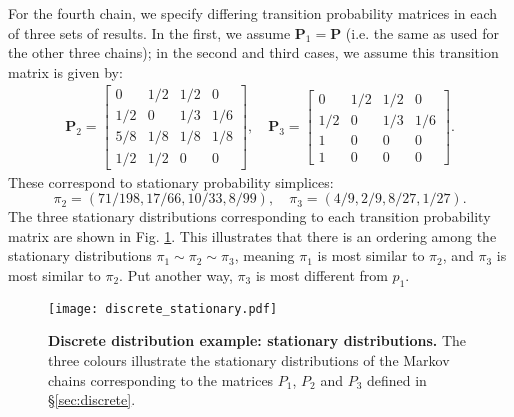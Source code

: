 \documentclass{article}
\begin{document}
For the fourth chain, we specify differing transition probability matrices in each of three sets of results. In the first, we assume $\boldsymbol{P}_1=\boldsymbol{P}$ (i.e. the same as used for the other three chains); in the second and third cases, we assume this transition matrix is given by:
%
\begin{gather}
\boldsymbol{P}_2
=
\begin{bmatrix}
0 & 1/2 & 1/2 & 0\\
1/2 & 0 & 1/3 & 1/6\\
5/8 & 1/8 & 1/8 & 1/8\\
1/2 & 1/2 & 0 & 0
\end{bmatrix},\quad
\boldsymbol{P}_3
=
\begin{bmatrix}
0 & 1/2 & 1/2 & 0\\
1/2 & 0 & 1/3 & 1/6\\
1 & 0 & 0 & 0\\
1 & 0 & 0 & 0
\end{bmatrix}.
\end{gather}
%
These correspond to stationary probability simplices:
%
\begin{equation}
\pi_2 = (71/198, 17/66, 10/33, 8/99), \quad \pi_3 = (4/9, 2/9, 8/27, 1/27).
\end{equation}
%
The three stationary distributions corresponding to each transition probability matrix are shown in Fig. \ref{fig:discrete_stationary}. This illustrates that there is an ordering among the stationary distributions $\pi_1\sim\pi_2\sim\pi_3$, meaning $\pi_1$ is most similar to $\pi_2$, and $\pi_3$ is most similar to $\pi_2$. Put another way, $\pi_3$ is most different from $p_1$.

\begin{figure}[!htb]
	\centerline{\texttt{[image: discrete\_stationary.pdf]}}
	\caption{\textbf{Discrete distribution example: stationary distributions.} The three colours illustrate the stationary distributions of the Markov chains corresponding to the matrices $P_1$, $P_2$ and $P_3$ defined in \S\ref{sec:discrete}.}
	\label{fig:discrete_stationary}
\end{figure}
\end{document}
